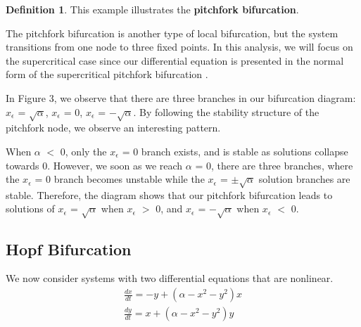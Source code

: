 \documentclass{article}
\theoremstyle{definition}
\newtheorem{definition}{Definition}[section]
\theoremstyle{remark}
\newenvironment{problem}[2][Example]{\begin{trivlist}
\item[\hskip \labelsep {\bfseries #1}\hskip \labelsep {\bfseries #2.}]}{\end{trivlist}}
\begin{document}
\begin{definition}
    This example illustrates the \textbf{pitchfork bifurcation}.
\end{definition}
The pitchfork bifurcation is another type of local bifurcation, but the system transitions from one node to three fixed points. In this analysis, we will focus on the supercritical case since our differential equation is presented in the normal form of the supercritical pitchfork bifurcation \cite{Balibrea2010}.

In Figure 3, we observe that there are three branches in our bifurcation diagram: $x_\epsilon$ = $\sqrt{\alpha}$, $x_\epsilon$ = $0$, $x_\epsilon$ = $-\sqrt{\alpha}$. By following the stability structure of the pitchfork node, we observe an interesting pattern. 

When $\alpha$ $<$ 0, only the $x_\epsilon$ = $0$ branch exists, and is stable as solutions collapse towards 0. However, we soon as we reach $\alpha$ = 0, there are three branches, where the $x_\epsilon$ = $0$ branch becomes unstable while the $x_\epsilon$ = $\pm \sqrt{\alpha}$ solution branches are stable. Therefore, the diagram shows that our pitchfork bifurcation leads to solutions of $x_\epsilon$ = $\sqrt{\alpha}$ when $x_\epsilon$ $>$ 0, and $x_\epsilon$ = $-\sqrt{\alpha}$ when $x_\epsilon$ $<$ 0.
\subsection{Hopf Bifurcation}
\begin{problem}{2.5.1}
We now consider systems with two differential equations that are nonlinear.   
\begin{align}\label{example 2.5}
    \frac{dx}{dt} = -y + (\alpha - x^2 -y^2)x 
    \\
    \frac{dy}{dt} = x+ (\alpha - x^2 -y^2)y
\end{align}
\end{problem}
\end{document}

